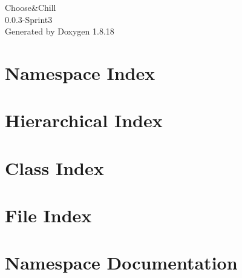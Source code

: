 \let\mypdfximage\pdfximage\def\pdfximage{\immediate\mypdfximage}\documentclass[twoside]{book}
\newcommand{\+}{\discretionary{\mbox{\scriptsize$\hookleftarrow$}}{}{}}
\newcommand{\clearemptydoublepage}{%
  \newpage{\pagestyle{empty}\cleardoublepage}%
}
\begin{document}
\hypersetup{pageanchor=false,
             bookmarksnumbered=true,
             pdfencoding=unicode
            }
\begin{titlepage}
\vspace*{7cm}
\begin{center}%
{\Large Choose\&Chill \\[1ex]\large 0.\+0.\+3-\/Sprint3 }\\
\vspace*{1cm}
{\large Generated by Doxygen 1.8.18}\\
\end{center}
\end{titlepage}
\clearemptydoublepage
{}
\tableofcontents
\clearemptydoublepage
{}
\hypersetup{pageanchor=true}

\chapter{Namespace Index}

\chapter{Hierarchical Index}

\chapter{Class Index}

\chapter{File Index}

\chapter{Namespace Documentation}











\end{document}
